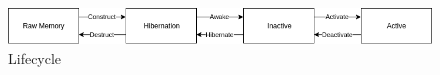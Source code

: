 \begin{figure}[tbp]
    \begin{center}
    \includegraphics[scale=0.5]{images/lifecycle_horizontal.png}
    \caption{Lifecycle}
    \label{fig:lifecycle}
    \end{center}
\end{figure}
